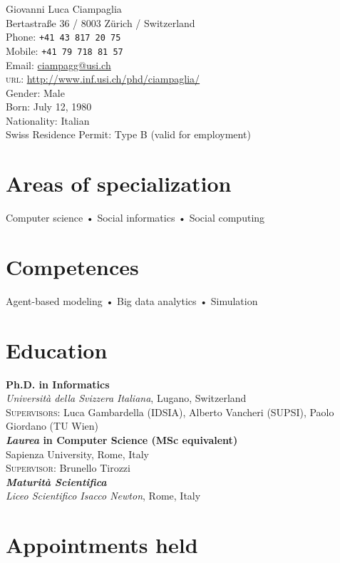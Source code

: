 \documentclass[10pt, a4paper]{article}
\newcommand{\years}[1]{\marginnote{\scriptsize #1}}
\begin{document}
{\LARGE Giovanni Luca Ciampaglia}\\[1cm]
Bertastraße 36 / 8003 Zürich / Switzerland\\[.2cm]
Phone: \texttt{+41 43 817 20 75}\\
Mobile: \texttt{+41 79 718 81 57}\\
Email: \href{mailto:ciampagg@usi.ch}{ciampagg@usi.ch}\\
\textsc{url}: \href{http://www.inf.usi.ch/phd/ciampaglia/}{http://www.inf.usi.ch/phd/ciampaglia/}\\[.2cm]
Gender: Male\\
Born:  July 12, 1980\\
Nationality: Italian\\
Swiss Residence Permit: Type B (valid for employment)

\section*{Areas of specialization}
Computer science • Social informatics • Social computing  

\section*{Competences}
Agent-based modeling • Big data analytics • Simulation

\section*{Education}
\noindent
\years{2011}\textbf{Ph.D. in Informatics}\\
\textsl{Università della Svizzera Italiana}, Lugano, Switzerland\\
\textsc{Supervisors}: Luca Gambardella (IDSIA), Alberto Vancheri (SUPSI), Paolo
Giordano (TU Wien)\\[1em]
\years{2006}\textbf{\textsl{Laurea} in Computer Science (MSc equivalent)}\\ Sapienza University, Rome, Italy\\
\textsc{Supervisor}: Brunello Tirozzi \\[1em]
\years{1999}\textbf{\textsl{Maturità Scientifica}}\\
\textsl{Liceo Scientifico Isacco Newton}, Rome, Italy\\

\section*{Appointments held}
\end{document}
